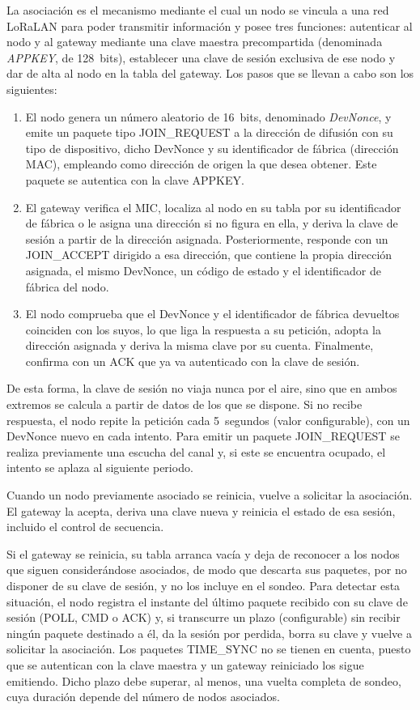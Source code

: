 La asociación es el mecanismo mediante el cual un nodo se vincula a una red LoRaLAN para poder transmitir información y posee tres funciones: autenticar al nodo y al gateway mediante una clave maestra precompartida (denominada \textit{APPKEY}, de 128~bits), establecer una clave de sesión exclusiva de ese nodo y dar de alta al nodo en la tabla del gateway. Los pasos que se llevan a cabo son los siguientes:

\begin{enumerate}
\item El nodo genera un número aleatorio de 16~bits, denominado \textit{DevNonce}, y emite un paquete tipo JOIN\_REQUEST a la dirección de difusión con su tipo de dispositivo, dicho DevNonce y su identificador de fábrica (dirección MAC), empleando como dirección de origen la que desea obtener. Este paquete se autentica con la clave APPKEY.

\item El gateway verifica el MIC, localiza al nodo en su tabla por su identificador de fábrica o le asigna una dirección si no figura en ella, y deriva la clave de sesión a partir de la dirección asignada. Posteriormente, responde con un JOIN\_ACCEPT dirigido a esa dirección, que contiene la propia dirección asignada, el mismo DevNonce, un código de estado y el identificador de fábrica del nodo.

\item El nodo comprueba que el DevNonce y el identificador de fábrica devueltos coinciden con los suyos, lo que liga la respuesta a su petición, adopta la dirección asignada y deriva la misma clave por su cuenta. Finalmente, confirma con un ACK que ya va autenticado con la clave de sesión.
\end{enumerate}
 
De esta forma, la clave de sesión no viaja nunca por el aire, sino que en ambos extremos se calcula a partir de datos de los que se dispone. Si no recibe respuesta, el nodo repite la petición cada 5~segundos (valor configurable), con un DevNonce nuevo en cada intento. Para emitir un paquete JOIN\_REQUEST se realiza previamente una escucha del canal y, si este se encuentra ocupado, el intento se aplaza al siguiente periodo.

Cuando un nodo previamente asociado se reinicia, vuelve a solicitar la asociación. El gateway la acepta, deriva una clave nueva y reinicia el estado de esa sesión, incluido el control de secuencia. 

Si el gateway se reinicia, su tabla arranca vacía y deja de reconocer a los nodos que siguen considerándose asociados, de modo que descarta sus paquetes, por no disponer de su clave de sesión, y no los incluye en el sondeo. Para detectar esta situación, el nodo registra el instante del último paquete recibido con su clave de sesión (POLL, CMD o ACK) y, si transcurre un plazo (configurable) sin recibir ningún paquete destinado a él, da la sesión por perdida, borra su clave y vuelve a solicitar la asociación. Los paquetes TIME\_SYNC no se tienen en cuenta, puesto que se autentican con la clave maestra y un gateway reiniciado los sigue emitiendo. Dicho plazo debe superar, al menos, una vuelta completa de sondeo, cuya duración depende del número de nodos asociados.

